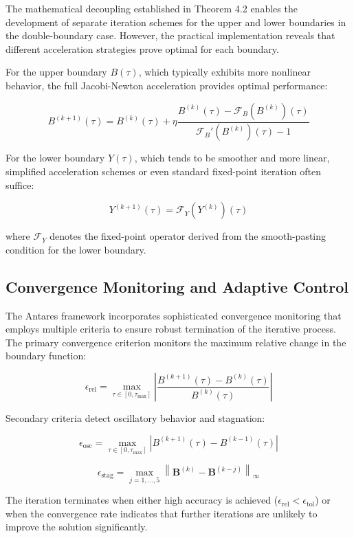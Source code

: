 \documentclass[
  american,
  11pt,
  11pt,
  letterpaper,
  onecolumn]{article}
\begin{document}
The mathematical decoupling established in Theorem 4.2 enables the
development of separate iteration schemes for the upper and lower
boundaries in the double-boundary case. However, the practical
implementation reveals that different acceleration strategies prove
optimal for each boundary.

For the upper boundary \(B(\tau)\), which typically exhibits more
nonlinear behavior, the full Jacobi-Newton acceleration provides optimal
performance:

\[B^{(k+1)}(\tau) = B^{(k)}(\tau) + \eta \frac{B^{(k)}(\tau) - \mathcal{F}_B(B^{(k)})(\tau)}{\mathcal{F}_B'(B^{(k)})(\tau) - 1} \tag{6.7}\]

For the lower boundary \(Y(\tau)\), which tends to be smoother and more
linear, simplified acceleration schemes or even standard fixed-point
iteration often suffice:

\[Y^{(k+1)}(\tau) = \mathcal{F}_Y(Y^{(k)})(\tau) \tag{6.8}\]

where \(\mathcal{F}_Y\) denotes the fixed-point operator derived from
the smooth-pasting condition for the lower boundary.

\subsection{Convergence Monitoring and Adaptive
Control}\label{convergence-monitoring-and-adaptive-control}

The Antares framework incorporates sophisticated convergence monitoring
that employs multiple criteria to ensure robust termination of the
iterative process. The primary convergence criterion monitors the
maximum relative change in the boundary function:

\[\epsilon_{\text{rel}} = \max_{\tau \in [0,\tau_{\max}]} \left|\frac{B^{(k+1)}(\tau) - B^{(k)}(\tau)}{B^{(k)}(\tau)}\right| \tag{6.9}\]

Secondary criteria detect oscillatory behavior and stagnation:

\[\epsilon_{\text{osc}} = \max_{\tau \in [0,\tau_{\max}]} \left|B^{(k+1)}(\tau) - B^{(k-1)}(\tau)\right| \tag{6.10}\]

\[\epsilon_{\text{stag}} = \max_{j=1,\ldots,5} \left\|\mathbf{B}^{(k)} - \mathbf{B}^{(k-j)}\right\|_{\infty} \tag{6.11}\]

The iteration terminates when either high accuracy is achieved
(\(\epsilon_{\text{rel}} < \epsilon_{\text{tol}}\)) or when the
convergence rate indicates that further iterations are unlikely to
improve the solution significantly.
\end{document}
